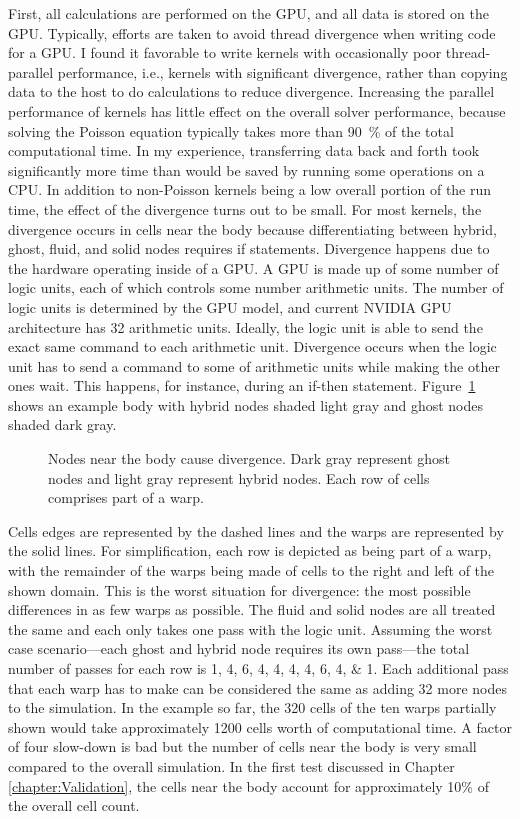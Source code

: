 First, all calculations are performed on the GPU, and all data is stored on the GPU.
Typically, efforts are taken to avoid thread divergence when writing code for a GPU. 
I found it favorable to write kernels with occasionally poor thread-parallel performance, i.e., kernels with significant divergence, rather than copying data to the host to do calculations to reduce divergence. 
Increasing the parallel performance of kernels has little effect on the overall solver performance, because solving the Poisson equation typically takes more than \SI{90}{\percent} of the total computational time. 
In my experience, transferring data back and forth took significantly more time than would be saved by running some operations on a CPU. 
In addition to non-Poisson kernels being a low overall portion of the run time, the effect of the divergence turns out to be small. 
For most kernels, the divergence occurs in cells near the body because differentiating between hybrid, ghost, fluid, and solid nodes requires if statements. 
Divergence happens due to the hardware operating inside of a GPU. 
A GPU is made up of some number of logic units, each of which controls some number arithmetic units. 
The number of logic units is determined by the GPU model, and current NVIDIA GPU architecture has 32 arithmetic units. 
Ideally, the logic unit is able to send the exact same command to each arithmetic unit. 
Divergence occurs when the logic unit has to send a command to some of arithmetic units while making the other ones wait. 
This happens, for instance, during an if-then statement. 
Figure~\ref{fig:divergence} shows an example body with hybrid nodes shaded light gray and ghost nodes shaded dark gray. 
\begin{figure}[!htb]
	\centering
	
	\caption{Nodes near the body cause divergence. Dark gray represent ghost nodes and light gray represent hybrid nodes. Each row of cells comprises part of a warp.}
	\label{fig:divergence}
\end{figure}
Cells edges are represented by the dashed lines and the warps are represented by the solid lines. 
For simplification, each row is depicted as being part of a warp, with the remainder of the warps being made of cells to the right and left of the shown domain. 
This is the worst situation for divergence: the most possible differences in as few warps as possible. 
The fluid and solid nodes are all treated the same and each only takes one pass with the logic unit. 
Assuming the worst case scenario---each ghost and hybrid node requires its own pass---the total number of passes for each row is \numlist{1;4;6;4;4;4;4;6;4;1}. 
Each additional pass that each warp has to make can be considered the same as adding 32 more nodes to the simulation. 
In the example so far, the 320 cells of the ten warps partially shown would take approximately 1200 cells worth of computational time. 
A factor of four slow-down is bad but the number of cells near the body is very small compared to the overall simulation. 
In the first test discussed in Chapter \ref{chapter:Validation}, the cells near the body account for approximately 10\% of the overall cell count.



